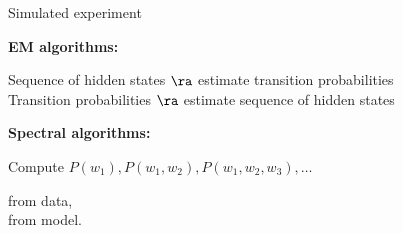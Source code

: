 \documentclass[final]{beamer}%
\begin{document}
\begin{frame}{Simulated experiment}
\begin{center}
 \end{center}
 \textbf{EM algorithms:}

   Sequence of hidden states $\ra$ estimate transition probabilities \\
   Transition probabilities $\ra$ estimate sequence of hidden states


 \vp \textbf{Spectral algorithms:}

 Compute $P(w_1), P(w_1,w_2), P(w_1,w_2,w_3),\ldots$  \hp
 \parbox[t]{0.3\linewidth}{
   from data, \\
   from model.
 }


%
\end{frame}


\end{document}

